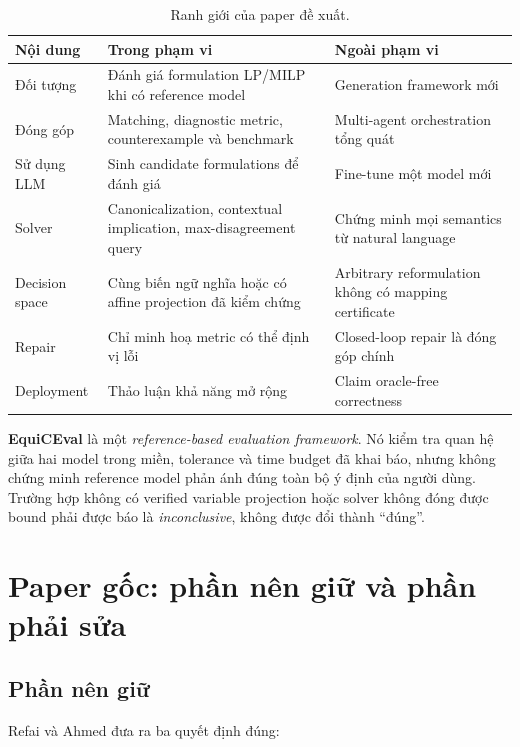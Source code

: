 \documentclass[11pt,a4paper]{article}
\newcommand{\method}{\textsf{\textbf{EquiCEval}}\xspace}
\begin{document}
\begin{table}[htbp]
\centering
\caption{Ranh giới của paper đề xuất.}
\small
\begin{tabularx}{\textwidth}{L{3.3cm} Y Y}
\toprule
\textbf{Nội dung} & \textbf{Trong phạm vi} & \textbf{Ngoài phạm vi} \\
\midrule
Đối tượng & Đánh giá formulation LP/MILP khi có reference model & Generation framework mới \\
Đóng góp & Matching, diagnostic metric, counterexample và benchmark & Multi-agent orchestration tổng quát \\
Sử dụng LLM & Sinh candidate formulations để đánh giá & Fine-tune một model mới \\
Solver & Canonicalization, contextual implication, max-disagreement query & Chứng minh mọi semantics từ natural language \\
Decision space & Cùng biến ngữ nghĩa hoặc có affine projection đã kiểm chứng & Arbitrary reformulation không có mapping certificate \\
Repair & Chỉ minh hoạ metric có thể định vị lỗi & Closed-loop repair là đóng góp chính \\
Deployment & Thảo luận khả năng mở rộng & Claim oracle-free correctness \\
\bottomrule
\end{tabularx}
\end{table}

\begin{warningbox}
\method là một \emph{reference-based evaluation framework}. Nó kiểm tra quan hệ giữa hai model trong miền, tolerance và time budget đã khai báo, nhưng không chứng minh reference model phản ánh đúng toàn bộ ý định của người dùng. Trường hợp không có verified variable projection hoặc solver không đóng được bound phải được báo là \emph{inconclusive}, không được đổi thành ``đúng''.
\end{warningbox}

\section{Paper gốc: phần nên giữ và phần phải sửa}

\subsection{Phần nên giữ}

Refai và Ahmed \parencite{refai2025component} đưa ra ba quyết định đúng:
\end{document}
